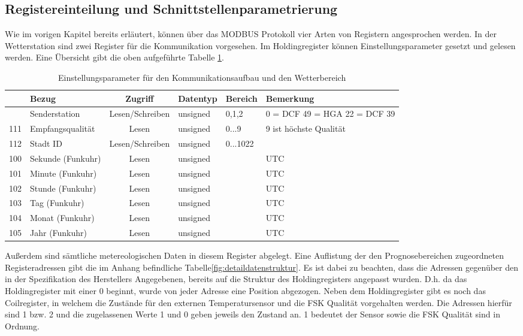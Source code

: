 \subsection{Registereinteilung und Schnittstellenparametrierung}
Wie im vorigen Kapitel bereits erläutert, können über das MODBUS Protokoll vier Arten von Registern angesprochen werden. In der Wetterstation sind zwei Register für die Kommunikation vorgesehen. Im Holdingregister können Einstellungsparameter gesetzt und gelesen werden. Eine Übersicht gibt die oben aufgeführte Tabelle \ref{tab:kommeinstpara}.
\begin{table}[t]
{
\setlength{\extrarowheight}{0.1cm}
\begin{tabular}{| c | l | c | l | l | p{2.5cm} |}
\hline
\textbf{\parbox[t]{2cm}{Register-\\adresse}} & \textbf{Bezug} & \textbf{Zugriff} & \textbf{Datentyp} & \textbf{Bereich} & \textbf{Bemerkung}\\[1cm]
\hline \hline
\hiderowcolors
110 & Senderstation & Lesen/Schreiben & unsigned & 0,1,2 & 0 = DCF 49 \newline 1 = HGA 22 \newline 2 = DCF 39\\
111 & Empfangsqualität & Lesen & unsigned & 0...9 & 9 ist höchste Qualität\\
112 & Stadt ID & Lesen/Schreiben & unsigned & 0...1022 & \\
100 & Sekunde (Funkuhr) & Lesen & unsigned & & UTC\\ 
101 & Minute (Funkuhr) & Lesen & unsigned & & UTC\\
102 & Stunde (Funkuhr) & Lesen & unsigned & & UTC\\
103 & Tag (Funkuhr) & Lesen & unsigned & & UTC\\
104 & Monat (Funkuhr) & Lesen & unsigned & & UTC\\
105 & Jahr (Funkuhr) & Lesen & unsigned & & UTC\\
\hline
\end{tabular}
}
\caption{Einstellungsparameter für den Kommunikationsaufbau und den Wetterbereich \cite[S. 16-17]{HKWDoc}}
\label{tab:kommeinstpara}
\end{table} 
Außerdem sind sämtliche metereologischen Daten in diesem Register abgelegt. Eine Auflistung der den Prognosebereichen zugeordneten Registeradressen gibt die im Anhang befindliche Tabelle\ref{fig:detaildatenstruktur}. Es ist dabei zu beachten, dass die Adressen gegenüber den in der Spezifikation des Herstellers Angegebenen, bereits auf die Struktur des Holdingregisters angepasst wurden. D.h. da das Holdingregister mit einer 0 beginnt, wurde von jeder Adresse eine Position abgezogen. Neben dem Holdingregister gibt es noch das Coilregister, in welchem die Zustände für den externen Temperatursensor und die FSK Qualität vorgehalten werden. Die Adressen hierfür sind 1 bzw. 2 und die zugelassenen Werte 1 und 0 geben jeweils den Zustand an. 1 bedeutet der Sensor sowie die FSK Qualität sind in Ordnung. 


    
